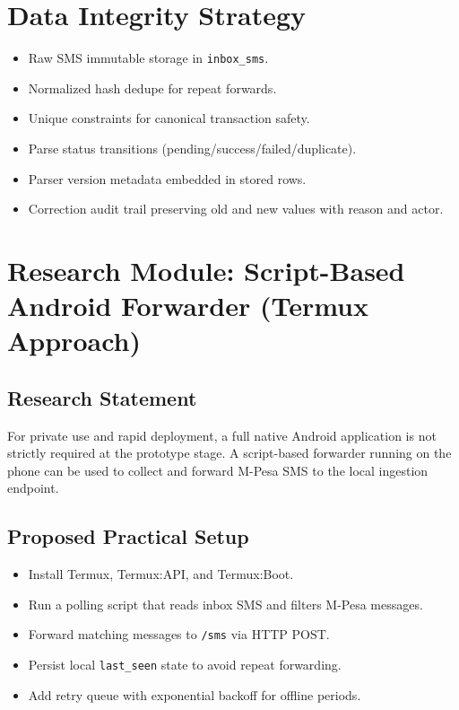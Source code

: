 \documentclass[12pt,a4paper]{article}
\begin{document}
\section{Data Integrity Strategy}
\begin{itemize}[leftmargin=1.5em]
  \item Raw SMS immutable storage in \texttt{inbox\_sms}.
  \item Normalized hash dedupe for repeat forwards.
  \item Unique constraints for canonical transaction safety.
  \item Parse status transitions (pending/success/failed/duplicate).
  \item Parser version metadata embedded in stored rows.
  \item Correction audit trail preserving old and new values with reason and actor.
\end{itemize}

\section{Research Module: Script-Based Android Forwarder (Termux Approach)}
\subsection{Research Statement}
For private use and rapid deployment, a full native Android application is not strictly required at the prototype stage. A script-based forwarder running on the phone can be used to collect and forward M-Pesa SMS to the local ingestion endpoint.

\subsection{Proposed Practical Setup}
\begin{itemize}[leftmargin=1.5em]
  \item Install Termux, Termux:API, and Termux:Boot.
  \item Run a polling script that reads inbox SMS and filters M-Pesa messages.
  \item Forward matching messages to \texttt{/sms} via HTTP POST.
  \item Persist local \texttt{last\_seen} state to avoid repeat forwarding.
  \item Add retry queue with exponential backoff for offline periods.
\end{itemize}
\end{document}
